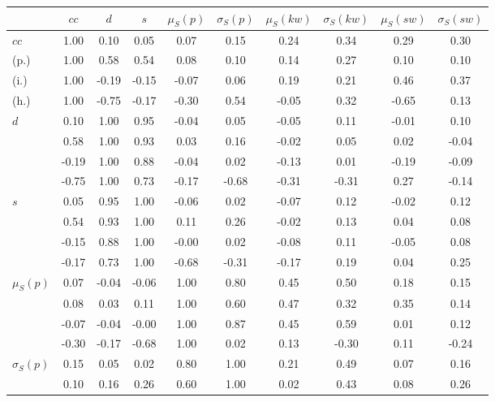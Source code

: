 \begin{table*}[h!]
\begin{center}
\begin{tabular}{| l | c | c | c | c | c | c | c | c | c |}\hline
 & $cc$ & $d$ & $s$ & $\mu_S(p)$ & $\sigma_S(p)$ & $\mu_S(kw)$ & $\sigma_S(kw)$ & $\mu_S(sw)$ & $\sigma_S(sw)$ \\\hline
$cc$ & 1.00  & 0.10  & 0.05  & 0.07  & 0.15  & 0.24  & 0.34  & 0.29  & 0.30 \\\hline
(p.) & 1.00  & 0.58  & 0.54  & 0.08  & 0.10  & 0.14  & 0.27  & 0.10  & 0.10 \\\hline
(i.) & 1.00  & -0.19  & -0.15  & -0.07  & 0.06  & 0.19  & 0.21  & 0.46  & 0.37 \\\hline
(h.) & 1.00  & -0.75  & -0.17  & -0.30  & 0.54  & -0.05  & 0.32  & -0.65  & 0.13 \\\hline
$d$ & 0.10  & 1.00  & 0.95  & -0.04  & 0.05  & -0.05  & 0.11  & -0.01  & 0.10 \\\hline
 & 0.58  & 1.00  & 0.93  & 0.03  & 0.16  & -0.02  & 0.05  & 0.02  & -0.04 \\\hline
 & -0.19  & 1.00  & 0.88  & -0.04  & 0.02  & -0.13  & 0.01  & -0.19  & -0.09 \\\hline
 & -0.75  & 1.00  & 0.73  & -0.17  & -0.68  & -0.31  & -0.31  & 0.27  & -0.14 \\\hline
$s$ & 0.05  & 0.95  & 1.00  & -0.06  & 0.02  & -0.07  & 0.12  & -0.02  & 0.12 \\\hline
 & 0.54  & 0.93  & 1.00  & 0.11  & 0.26  & -0.02  & 0.13  & 0.04  & 0.08 \\\hline
 & -0.15  & 0.88  & 1.00  & -0.00  & 0.02  & -0.08  & 0.11  & -0.05  & 0.08 \\\hline
 & -0.17  & 0.73  & 1.00  & -0.68  & -0.31  & -0.17  & 0.19  & 0.04  & 0.25 \\\hline
$\mu_S(p)$ & 0.07  & -0.04  & -0.06  & 1.00  & 0.80  & 0.45  & 0.50  & 0.18  & 0.15 \\\hline
 & 0.08  & 0.03  & 0.11  & 1.00  & 0.60  & 0.47  & 0.32  & 0.35  & 0.14 \\\hline
 & -0.07  & -0.04  & -0.00  & 1.00  & 0.87  & 0.45  & 0.59  & 0.01  & 0.12 \\\hline
 & -0.30  & -0.17  & -0.68  & 1.00  & 0.02  & 0.13  & -0.30  & 0.11  & -0.24 \\\hline
$\sigma_S(p)$ & 0.15  & 0.05  & 0.02  & 0.80  & 1.00  & 0.21  & 0.49  & 0.07  & 0.16 \\\hline
 & 0.10  & 0.16  & 0.26  & 0.60  & 1.00  & 0.02  & 0.43  & 0.08  & 0.26 \\\hline

\end{tabular}
\end{center}
\end{table*}
